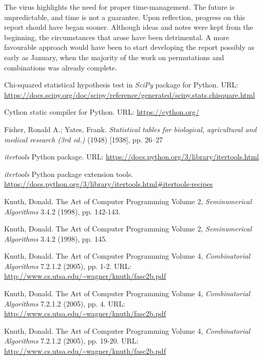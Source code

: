 \documentclass[12pt]{article}
\begin{document}
The virus highlights the need for proper time-management. The future is unpredictable, and time is not a guarantee. Upon reflection, progress on this report should have began sooner. Although ideas and notes were kept from the beginning, the circumstances that arose have been detrimental. A more favourable approach would have been to start developing the report possibly as early as January, when the majority of the work on permutations and combinations was already complete. 

\pagebreak

\begin{thebibliography}{00}

Chi-squared statistical hypothesis test in \textit{SciPy} package for Python. URL: \url{https://docs.scipy.org/doc/scipy/reference/generated/scipy.stats.chisquare.html}

Cython static compiler for Python. URL: \url{https://cython.org/}

Fisher, Ronald A.; Yates, Frank. \textit{Statistical tables for biological, agricultural and medical research (3rd ed.)} (1948) [1938], pp. 26–27

\textit{itertools} Python package. URL: \url{https://docs.python.org/3/library/itertools.html}

\textit{itertools} Python package extension tools. \url{https://docs.python.org/3/library/itertools.html#itertools-recipes}

Knuth, Donald. The Art of Computer Programming Volume 2, \textit{Seminumerical Algorithms} 3.4.2 (1998), pp. 142-143.

Knuth, Donald. The Art of Computer Programming Volume 2, \textit{Seminumerical Algorithms} 3.4.2 (1998), pp. 145.

Knuth, Donald. The Art of Computer Programming Volume 4, \textit{Combinatorial Algorithms} 7.2.1.2 (2005), pp. 1-2. URL: \url{http://www.cs.utsa.edu/~wagner/knuth/fasc2b.pdf}

Knuth, Donald. The Art of Computer Programming Volume 4, \textit{Combinatorial Algorithms} 7.2.1.2 (2005), pp. 4. URL: \url{http://www.cs.utsa.edu/~wagner/knuth/fasc2b.pdf}

Knuth, Donald. The Art of Computer Programming Volume 4, \textit{Combinatorial Algorithms} 7.2.1.2 (2005), pp. 19-20. URL: \url{http://www.cs.utsa.edu/~wagner/knuth/fasc2b.pdf}


\end{thebibliography}
\end{document}

